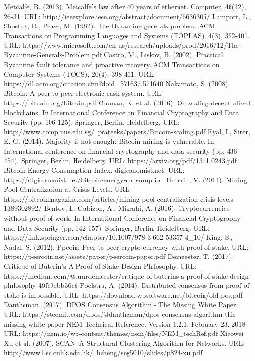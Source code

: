 \documentclass[a4paper,12pt]{article}
\begin{document}
\begin{thebibliography}{99}
  Metcalfe, B. (2013). Metcalfe's law after 40 years of ethernet. Computer, 46(12), 26-31. URL: http://ieeexplore.ieee.org/abstract/document/6636305/
  Lamport, L., Shostak, R., Pease, M. (1982). The Byzantine generals problem. ACM Transactions on Programming Languages and Systems (TOPLAS), 4(3), 382-401. URL: https://www.microsoft.com/en-us/research/uploads/prod/2016/12/The-Byzantine-Generals-Problem.pdf
  Castro, M., Liskov, B. (2002). Practical Byzantine fault tolerance and proactive recovery. ACM Transactions on Computer Systems (TOCS), 20(4), 398-461. URL: https://dl.acm.org/citation.cfm?doid=571637.571640
  Nakamoto, S. (2008). Bitcoin: A peer-to-peer electronic cash system. URL: https://bitcoin.org/bitcoin.pdf
  Croman, K. et al. (2016). On scaling decentralized blockchains. In International Conference on Financial Cryptography and Data Security (pp. 106-125). Springer, Berlin, Heidelberg. URL: http://www.comp.nus.edu.sg/~prateeks/papers/Bitcoin-scaling.pdf
  Eyal, I., Sirer, E. G. (2014). Majority is not enough: Bitcoin mining is vulnerable. In International conference on financial cryptography and data security (pp. 436-454). Springer, Berlin, Heidelberg. URL: https://arxiv.org/pdf/1311.0243.pdf
  Bitcoin Energy Consumption Index. digiconomist.net. URL: https://digiconomist.net/bitcoin-energy-consumption
  Buterin, V. (2014). Mining Pool Centralization at Crisis Levels. URL: https://bitcoinmagazine.com/articles/mining-pool-centralization-crisis-levels-1389302892/
  Bentov, I., Gabizon, A., Mizrahi, A. (2016). Cryptocurrencies without proof of work. In International Conference on Financial Cryptography and Data Security (pp. 142-157). Springer, Berlin, Heidelberg. URL: https://link.springer.com/chapter/10.1007/978-3-662-53357-4\_10/
  King, S., Nadal, S. (2012). Ppcoin: Peer-to-peer crypto-currency with proof-of-stake. URL: https://peercoin.net/assets/paper/peercoin-paper.pdf
  Demeester, T. (2017). Critique of Buterin’s A Proof of Stake Design Philosophy. URL: https://medium.com/@tuurdemeester/critique-of-buterins-a-proof-of-stake-design-philosophy-49fc9ebb36c6
  Poelstra, A. (2014). Distributed consensus from proof of stake is impossible. URL: https://download.wpsoftware.net/bitcoin/old-pos.pdf
  Dantheman. (2017). DPOS Consensus Algorithm - The Missing White Paper. URL: https://steemit.com/dpos/@dantheman/dpos-consensus-algorithm-this-missing-white-paper
  NEM Technical Reference. Version 1.2.1. February 23, 2018 URL: https://nem.io/wp-content/themes/nem/files/NEM\_techRef.pdf
 Xiaowei Xu et al. (2007). SCAN: A Structural Clustering Algorithm for Networks. URL: http://www1.se.cuhk.edu.hk/~hcheng/seg5010/slides/p824-xu.pdf
\end{thebibliography}
\end{document}
